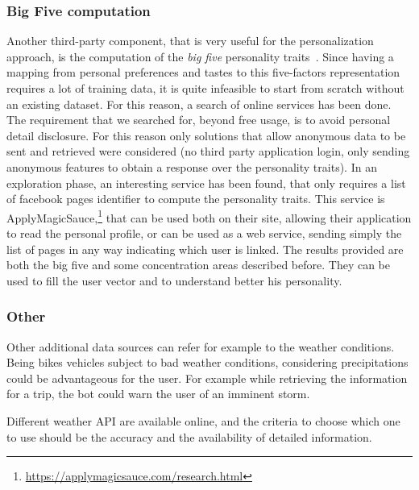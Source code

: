 \subsubsection{Big Five computation}
\label{approachIRbig5}

Another third-party component, that is very useful for the personalization approach, is the computation of the \textit{big five} personality traits~\cite{goldberg1993structure}. Since having a mapping from personal preferences and tastes to this five-factors representation requires a lot of training data, it is quite infeasible to start from scratch without an existing dataset. For this reason, a search of online services has been done. The requirement that we searched for, beyond free usage, is to avoid personal detail disclosure. For this reason only solutions that allow anonymous data to be sent and retrieved were considered (no third party application login, only sending anonymous features to obtain a response over the personality traits). In an exploration phase, an interesting service has been found, that only requires a list of facebook pages identifier to compute the personality traits. This service is ApplyMagicSauce,\footnote{\url{https://applymagicsauce.com/research.html}} that can be used both on their site, allowing their application to read the personal profile, or can be used as a web service, sending simply the list of pages in any way indicating which user is linked. The results provided are both the big five and some concentration areas described before. They can be used to fill the user vector and to understand better his personality.

\subsubsection{Other}
Other additional data sources can refer for example to the weather conditions. Being bikes vehicles subject to bad weather conditions, considering precipitations could be advantageous for the user. For example while retrieving the information for a trip, the bot could warn the user of an imminent storm.

Different weather API are available online, and the criteria to choose which one to use should be the accuracy and the availability of detailed information.
